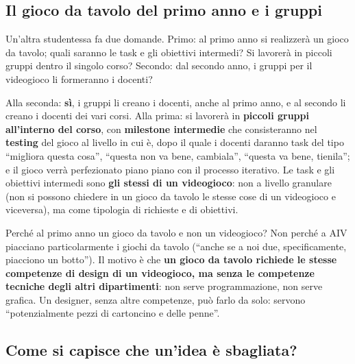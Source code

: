 \subsection{Il gioco da tavolo del primo anno e i gruppi}

Un'altra studentessa fa due domande. Primo: al primo anno si realizzerà un
gioco da tavolo; quali saranno le task e gli obiettivi intermedi? Si
lavorerà in piccoli gruppi dentro il singolo corso? Secondo: dal secondo
anno, i gruppi per il videogioco li formeranno i docenti?

Alla seconda: \textbf{sì}, i gruppi li creano i docenti, anche al primo
anno, e al secondo li creano i docenti dei vari corsi. Alla prima: si
lavorerà in \textbf{piccoli gruppi all'interno del corso}, con
\textbf{milestone intermedie} che consisteranno nel \textbf{testing} del gioco
al livello in cui è, dopo il quale i docenti daranno task del tipo
``migliora questa cosa'', ``questa non va bene, cambiala'', ``questa va
bene, tienila''; e il gioco verrà perfezionato piano piano con il processo
iterativo. Le task e gli obiettivi intermedi sono \textbf{gli stessi di un
videogioco}: non a livello granulare (non si possono chiedere in un gioco da
tavolo le stesse cose di un videogioco e viceversa), ma come tipologia di
richieste e di obiettivi.

Perché al primo anno un gioco da tavolo e non un videogioco? Non perché a
AIV piacciano particolarmente i giochi da tavolo (``anche se a noi due,
specificamente, piacciono un botto''). Il motivo è che \textbf{un gioco da
tavolo richiede le stesse competenze di design di un videogioco, ma senza le
competenze tecniche degli altri dipartimenti}: non serve programmazione, non
serve grafica. Un designer, senza altre competenze, può farlo da solo:
servono ``potenzialmente pezzi di cartoncino e delle penne''.

\subsection{Come si capisce che un'idea è sbagliata?}

